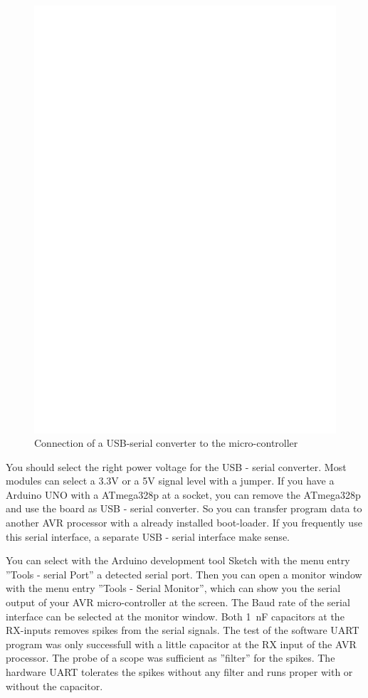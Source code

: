 \begin{figure}[H]
\centering
\includegraphics[width=12cm]{../FIG/UM232.eps}
\caption{Connection of a USB-serial converter to the micro-controller}
\label{fig:UM232}
\end{figure}

You should select the right power voltage for the USB - serial converter.
Most modules can select a 3.3V or a 5V signal level with a jumper.
If you have a Arduino UNO with a ATmega328p at a socket, you can remove the
ATmega328p and use the board as USB - serial converter.
So you can transfer program data to another AVR processor with a already
installed boot-loader. If you frequently use this serial interface,
a separate USB - serial interface make sense.

You can select with the Arduino development tool Sketch with the menu entry ''Tools - serial Port''
a detected serial port. Then you can open a monitor window with the menu entry ''Tools - Serial Monitor'',
which can show you the serial output of your AVR micro-controller at the screen.
The Baud rate of the serial interface can be selected at the monitor window.
Both 1~nF capacitors at the RX-inputs removes spikes from the serial signals.
The test of the software UART program was only successfull with a little capacitor
at the RX input of the AVR processor. The probe of a scope was sufficient as ''filter'' for the spikes.
The hardware UART tolerates the spikes without any filter and runs proper
with or without the capacitor. 

